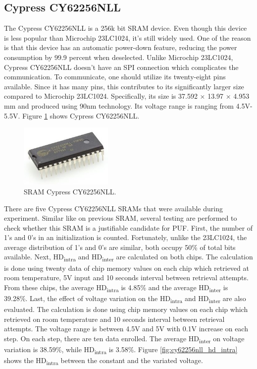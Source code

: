 \subsection{Cypress CY62256NLL}
The Cypress CY62256NLL is a 256k bit SRAM device. Even though this device is less popular than Microchip 23LC1024, it's still widely used. One of the reason is that this device has an automatic power-down feature, reducing the power consumption by 99.9 percent when deselected. Unlike Microchip 23LC1024, Cypress CY62256NLL doesn't have an SPI connection which complicates the communication. To communicate, one should utilize its twenty-eight pins available. Since it has many pins, this contributes to its significantly larger size compared to Microchip 23LC1024. Specifically, its size is 37.592 × 13.97 × 4.953 mm and produced using 90nm technology. Its voltage range is ranging from 4.5V-5.5V. Figure \ref{fig:CY62256NLL} shows Cypress CY62256NLL.

\begin{figure}[tph!]
    \centerline{\includegraphics[width={0.4\textwidth}]{images/cy62256nll}}
    \caption{SRAM Cypress CY62256NLL.}
    \label{fig:CY62256NLL}
\end{figure}

There are five Cypress CY62256NLL SRAMs that were available during experiment. Similar like on previous SRAM, several testing are performed to check whether this SRAM is a justifiable candidate for PUF.
First, the number of 1's and 0's in an initialization is counted. Fortunately, unlike the 23LC1024, the average distribution of 1's and 0's are similar, both occupy 50\% of total bits available.
Next,
HD\textsubscript{intra} and HD\textsubscript{inter} are calculated on both chips. The calculation is done using twenty data of chip memory values on each chip which retrieved at room temperature, 5V input and 10 seconds interval between retrieval attempts.
From these chips, the average HD\textsubscript{intra} is 4.85\% and the average HD\textsubscript{inter} is 39.28\%.
Last, the effect of voltage variation on the HD\textsubscript{intra} and HD\textsubscript{inter} are also evaluated. The calculation is done using chip memory values on each chip which retrieved on room temperature and 10 seconds interval between retrieval attempts. The voltage range is between 4.5V and 5V with 0.1V increase on each step. On each step, there are ten data enrolled.
The average HD\textsubscript{inter} on voltage variation is 38.59\%, while HD\textsubscript{intra} is 3.58\%. Figure \ref{fig:cy62256nll_hd_intra} shows the HD\textsubscript{intra} between the constant and the variated voltage.

